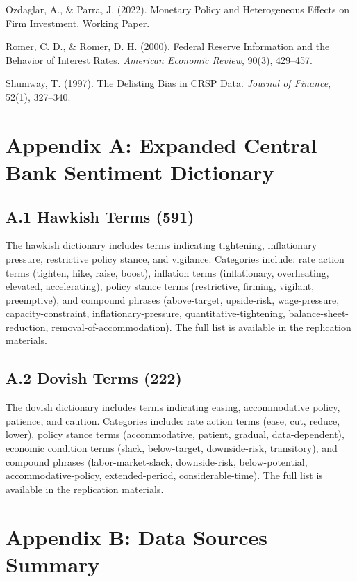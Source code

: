 Ozdaglar, A., \& Parra, J. (2022). Monetary Policy and Heterogeneous Effects on Firm Investment. Working Paper.

Romer, C. D., \& Romer, D. H. (2000). Federal Reserve Information and the Behavior of Interest Rates. \textit{American Economic Review}, 90(3), 429--457.

Shumway, T. (1997). The Delisting Bias in CRSP Data. \textit{Journal of Finance}, 52(1), 327--340.


\section{Appendix A: Expanded Central Bank Sentiment Dictionary}

\subsection{A.1 Hawkish Terms (591)}

The hawkish dictionary includes terms indicating tightening, inflationary pressure, restrictive policy stance, and vigilance. Categories include: rate action terms (tighten, hike, raise, boost), inflation terms (inflationary, overheating, elevated, accelerating), policy stance terms (restrictive, firming, vigilant, preemptive), and compound phrases (above-target, upside-risk, wage-pressure, capacity-constraint, inflationary-pressure, quantitative-tightening, balance-sheet-reduction, removal-of-accommodation). The full list is available in the replication materials.

\subsection{A.2 Dovish Terms (222)}

The dovish dictionary includes terms indicating easing, accommodative policy, patience, and caution. Categories include: rate action terms (ease, cut, reduce, lower), policy stance terms (accommodative, patient, gradual, data-dependent), economic condition terms (slack, below-target, downside-risk, transitory), and compound phrases (labor-market-slack, downside-risk, below-potential, accommodative-policy, extended-period, considerable-time). The full list is available in the replication materials.


\section{Appendix B: Data Sources Summary}

